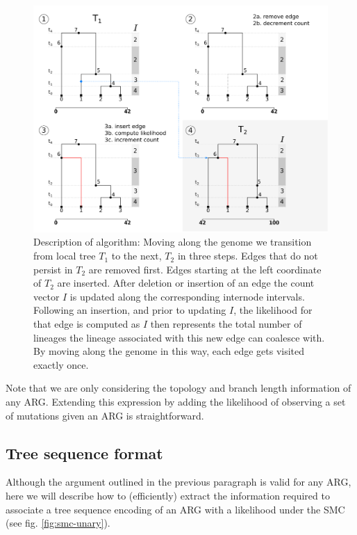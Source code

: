 \documentclass{article}
\begin{document}
\begin{figure}[!ht] \label{fig:algo}
\centering
\includegraphics[width=\textwidth]{figures/ts_algo_2rows.png}
\caption{Description of algorithm: Moving along the genome we transition from  
local tree $T_1$ to the next, $T_2$ in three steps. 
Edges that do not persist in $T_2$ are 
removed first. Edges starting at the left coordinate of $T_2$ are inserted. 
After deletion or insertion of an edge the count vector $I$ is updated along the 
corresponding internode intervals. Following an insertion, and prior to updating $I$, 
the likelihood for that edge is computed as $I$ then represents the total number of 
lineages the lineage associated with this new edge can 
coalesce with. By moving along the genome in this way, each edge gets visited exactly once.}
\end{figure}

Note that we are only considering the topology and branch length information of any ARG. 
Extending this expression by adding the likelihood of observing a set of mutations 
given an ARG is straightforward.


\subsection{Tree sequence format} \label{par:algo}

Although the argument outlined in the previous paragraph is valid for any ARG, here we 
will describe how to (efficiently) extract the information required to associate a
tree sequence encoding of an ARG with a likelihood under the SMC (see fig. \ref{fig:smc-unary}).\\
\end{document}
